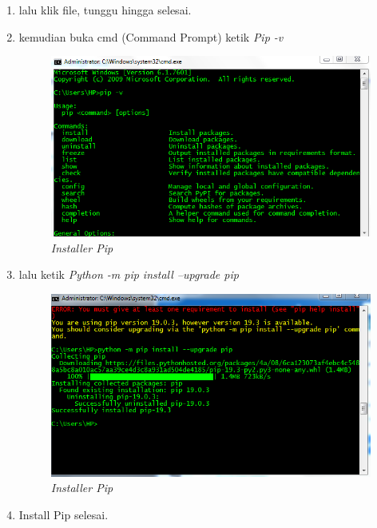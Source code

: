 \begin{enumerate}
 \item lalu klik file, tunggu hingga selesai.
 \item kemudian buka cmd (Command Prompt) ketik \textit{Pip -v}
     \begin{figure}[!htbp]
    \centering
    \includegraphics[scale=0.5]{figures/pip1.PNG}
    \caption{\textit{Installer Pip}}
    \label{Figurepython}
    \end{figure}
\item lalu ketik \textit{Python -m pip install --upgrade pip}
     \begin{figure}[!htbp]
    \centering
    \includegraphics[scale=0.5]{figures/pip2.PNG}
    \caption{\textit{Installer Pip}}
    \label{Figurepython}
    \end{figure}
 \item Install Pip selesai.
 \end{enumerate}

